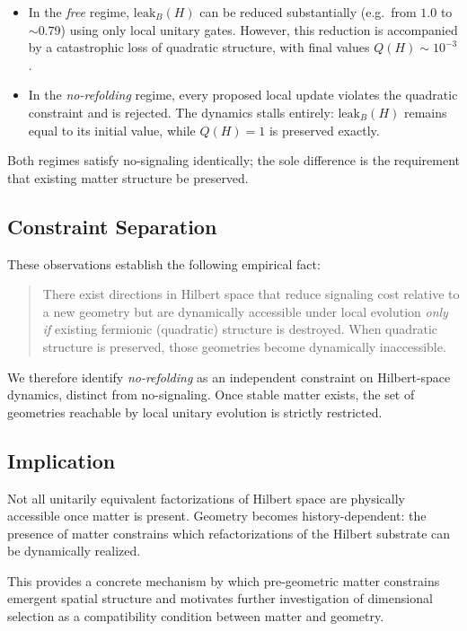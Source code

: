 \begin{itemize}
  \item In the \emph{free} regime, $\mathrm{leak}_B(H)$ can be reduced substantially
        (e.g.\ from $1.0$ to $\sim 0.79$) using only local unitary gates.
        However, this reduction is accompanied by a catastrophic loss of quadratic
        structure, with final values $Q(H)\sim 10^{-3}$.
  \item In the \emph{no-refolding} regime, every proposed local update violates the
        quadratic constraint and is rejected. The dynamics stalls entirely:
        $\mathrm{leak}_B(H)$ remains equal to its initial value, while $Q(H)=1$ is
        preserved exactly.
\end{itemize}

Both regimes satisfy no-signaling identically; the sole difference is the requirement
that existing matter structure be preserved.

\subsection*{Constraint Separation}

These observations establish the following empirical fact:

\begin{quote}
There exist directions in Hilbert space that reduce signaling cost relative to a new
geometry but are dynamically accessible under local evolution \emph{only if} existing
fermionic (quadratic) structure is destroyed. When quadratic structure is preserved,
those geometries become dynamically inaccessible.
\end{quote}

We therefore identify \emph{no-refolding} as an independent constraint on Hilbert-space
dynamics, distinct from no-signaling. Once stable matter exists, the set of geometries
reachable by local unitary evolution is strictly restricted.

\subsection*{Implication}

Not all unitarily equivalent factorizations of Hilbert space are physically accessible
once matter is present. Geometry becomes history-dependent: the presence of matter
constrains which refactorizations of the Hilbert substrate can be dynamically realized.

This provides a concrete mechanism by which pre-geometric matter constrains emergent
spatial structure and motivates further investigation of dimensional selection as a
compatibility condition between matter and geometry.
